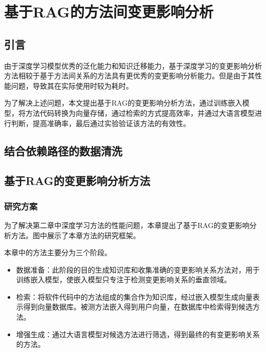 \chapter{基于RAG的方法间变更影响分析}

\section{引言}

由于深度学习模型优秀的泛化能力和知识迁移能力，基于深度学习的变更影响分析方法相较于基于方法间关系的方法具有更优秀的变更影响分析能力。但是由于其性能问题，导致其在实际使用时较为耗时。

为了解决上述问题，本文提出基于RAG的变更影响分析方法，通过训练嵌入模型，将方法代码转换为向量存储，通过检索的方式提高效率，并通过大语言模型进行判断，提高准确率，最后通过实验验证该方法的有效性。

\section{结合依赖路径的数据清洗}



\section{基于RAG的变更影响分析方法}

\subsection{研究方案}

为了解决第二章中深度学习方法的性能问题，本章提出了基于RAG的变更影响分析方法。图中展示了本章方法的研究框架。

本章中的方法主要分为三个阶段。

\begin{itemize}

    \item 数据准备：此阶段的目的生成知识库和收集准确的变更影响关系方法对，用于训练嵌入模型，使嵌入模型只专注于检测变更影响关系的垂直领域。

    \item 检索：将软件代码中的方法组成的集合作为知识库，经过嵌入模型生成向量表示得到向量数据库。被测方法嵌入得到用户向量，在数据库中检索得到候选方法。
    
    \item 增强生成：通过大语言模型对候选方法进行筛选，得到最终的有变更影响关系的方法。
    
\end{itemize}


